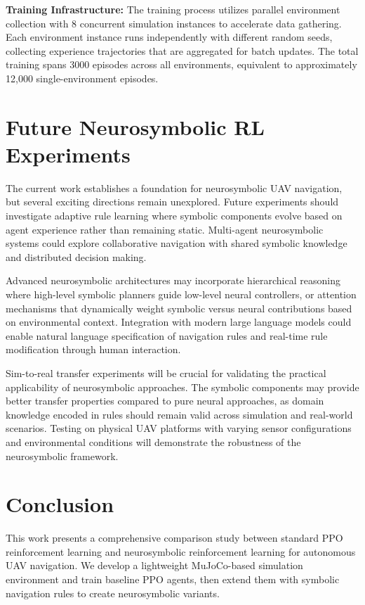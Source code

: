 \documentclass[pdflatex,sn-mathphys-num]{sn-jnl}
\theoremstyle{thmstyleone}%
\theoremstyle{thmstyletwo}%
\theoremstyle{thmstylethree}%
\begin{document}
\textbf{Training Infrastructure:} The training process utilizes parallel environment collection with 8 concurrent simulation instances to accelerate data gathering. Each environment instance runs independently with different random seeds, collecting experience trajectories that are aggregated for batch updates. The total training spans 3000 episodes across all environments, equivalent to approximately 12,000 single-environment episodes.





\section{Future Neurosymbolic RL Experiments}

The current work establishes a foundation for neurosymbolic UAV navigation, but several exciting directions remain unexplored. Future experiments should investigate adaptive rule learning where symbolic components evolve based on agent experience rather than remaining static. Multi-agent neurosymbolic systems could explore collaborative navigation with shared symbolic knowledge and distributed decision making.

Advanced neurosymbolic architectures may incorporate hierarchical reasoning where high-level symbolic planners guide low-level neural controllers, or attention mechanisms that dynamically weight symbolic versus neural contributions based on environmental context. Integration with modern large language models could enable natural language specification of navigation rules and real-time rule modification through human interaction.

Sim-to-real transfer experiments will be crucial for validating the practical applicability of neurosymbolic approaches. The symbolic components may provide better transfer properties compared to pure neural approaches, as domain knowledge encoded in rules should remain valid across simulation and real-world scenarios. Testing on physical UAV platforms with varying sensor configurations and environmental conditions will demonstrate the robustness of the neurosymbolic framework.

\section*{Conclusion}

This work presents a comprehensive comparison study between standard PPO reinforcement learning and neurosymbolic reinforcement learning for autonomous UAV navigation. We develop a lightweight MuJoCo-based simulation environment and train baseline PPO agents, then extend them with symbolic navigation rules to create neurosymbolic variants.
\end{document}
